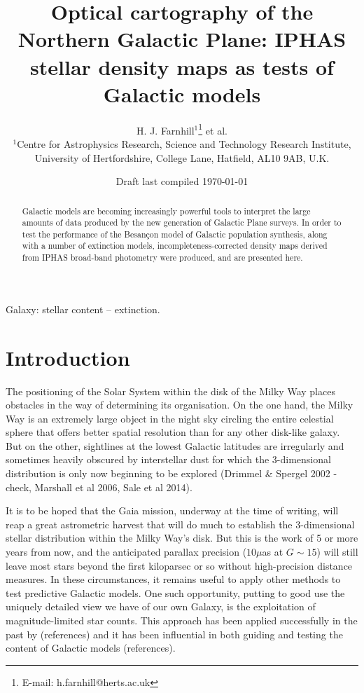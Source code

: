 \documentclass[a4paper,useAMS,usenatbib]{mn2e}
\title[Optical cartography of the Northern Galactic Plane]{Optical cartography 
of the Northern Galactic Plane: IPHAS stellar density maps as tests of Galactic models}
\author[H. J. Farnhill et al.]{H. J. Farnhill$^{1}$\thanks{E-mail:
h.farnhill@herts.ac.uk} et al.
\\
$^{1}$Centre for Astrophysics Research, Science and Technology Research Institute, University of Hertfordshire, College Lane, Hatfield, AL10 9AB, U.K.}
\begin{document}
\date{Draft last compiled \today}

\pagerange{\pageref{firstpage}--\pageref{lastpage}} 

\maketitle

\label{firstpage}

\begin{abstract}
Galactic models are becoming increasingly powerful tools to interpret the 
large amounts of data produced by the new generation of Galactic Plane 
surveys. In order to test the performance of the Besan\c{c}on model of 
Galactic population synthesis, along with a number of extinction models, 
incompleteness-corrected density maps derived from IPHAS broad-band photometry 
were produced, and are presented here.
\end{abstract}

\begin{keywords}
Galaxy: stellar content -- extinction.
\end{keywords}

\section{Introduction}
The positioning of the Solar System within the disk of the Milky
Way places obstacles in the way of determining its organisation. 
On the one hand, the Milky Way is an extremely large object in the night sky 
circling the entire celestial sphere that offers better spatial resolution 
than for any other disk-like galaxy. But on the other, sightlines 
at the lowest Galactic latitudes are irregularly and sometimes heavily 
obscured by interstellar dust for which the 3-dimensional distribution is 
only now beginning to be explored (Drimmel \& Spergel 2002 - check, 
Marshall et al 2006, Sale et al 2014).  

It is to be hoped that the Gaia 
mission, underway at the time of writing, will reap a great astrometric 
harvest that will do much to establish the 3-dimensional stellar 
distribution within the Milky Way's disk.  But this is the work of 5 or 
more years from now, and the anticipated parallax precision ($10\mu$as at 
$G \sim 15$) will still leave most stars beyond the first kiloparsec or so 
without high-precision distance measures.  In these circumstances, it remains useful 
to apply other methods to test predictive Galactic models.  One such 
opportunity, putting to good use the uniquely detailed view we have of our 
own Galaxy, is the exploitation of magnitude-limited star counts.  This 
approach has been applied successfully in the past by (references) and it 
has been influential in both guiding and testing the content of Galactic 
models (references).  
\end{document}

